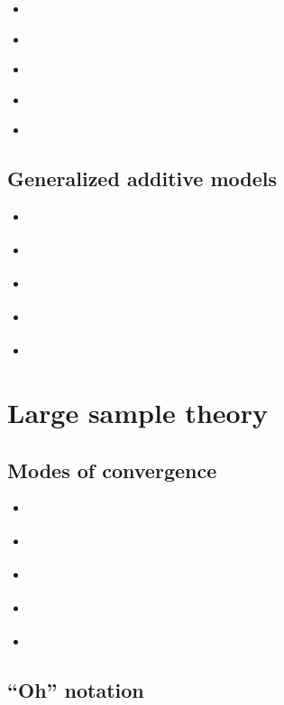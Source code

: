 \documentclass{report}
\begin{document}
\begin{itemize}
    \item \cite[Chapter~11.5]{dobson_introduction_2018}
    \item \cite[Chapter~13]{faraway_extending_2016}
    \item \cite[Chapter~9]{wakefield_bayesian_2013}
    \item \cite[Chapter~9]{agresti_foundations_2015}
    \item \cite[Chapter~18.4]{hardin_generalized_2018}
\end{itemize}

\subsection{Generalized additive models}

\begin{itemize}
    \item \cite[Chapter~15]{faraway_extending_2016}
    \item \cite[Chapters~4-7]{wood_generalized_2017}
    \item \cite[Chapters~4-7]{hastie_generalized_1990}
    \item \cite[Chapter~9.1]{hastie_elements_2009}
    \item \cite{rigby_generalized_2005}
\end{itemize}

\section{Large sample theory}\label{sec:reading-lst}

\subsection{Modes of convergence}

\begin{itemize}
    \item \cite[Chapter~2.1]{van_der_vaart_asymptotic_1998}
    \item \cite[Chapter~1.1]{dasgupta_asymptotic_2008}
    \item \cite[Chapter 5.5]{casella_statistical_2002}
    \item \cite[Chapter~2]{lehmann_elements_1999}
    \item \cite[Chapter~1.2-6]{serfling_approximation_1980}
\end{itemize}

\subsection{``Oh'' notation}
\end{document}

